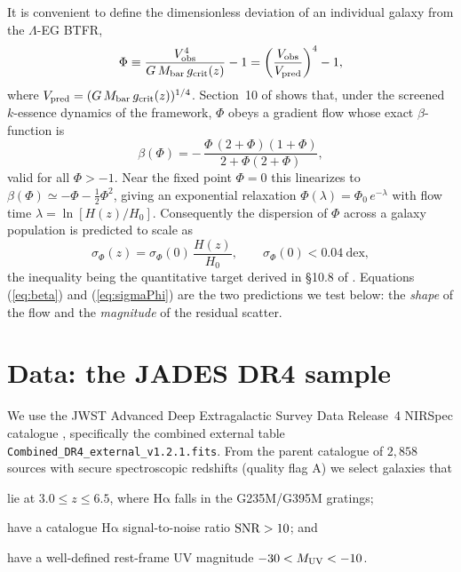 \documentclass{rmxaa}
\newcommand{\gcrit}{g_{\rm crit}}
\newcommand{\Mbar}{M_{\rm bar}}
\newcommand{\Vobs}{V_{\rm obs}}
\newcommand{\Vpred}{V_{\rm pred}}
\newcommand{\Ha}{\ensuremath{\mathrm{H\alpha}}}
\newcommand{\LEG}{\mbox{$\Lambda$-EG}}
\begin{document}
It is convenient to define the dimensionless deviation of an individual
galaxy from the \LEG{} BTFR,
\begin{equation}
  \label{eq:Phi}
  \Phi \equiv \frac{\Vobs^4}{G\,\Mbar\,\gcrit(z)}-1
        = \left(\frac{\Vobs}{\Vpred}\right)^4-1,
\end{equation}
where $\Vpred=(G\,\Mbar\,\gcrit(z))^{1/4}$. Section~10 of
\citet{FigueroaTorres2026} shows that, under the screened $k$-essence
dynamics of the framework, $\Phi$ obeys a gradient flow whose exact
$\beta$-function is
\begin{equation}
  \label{eq:beta}
  \beta(\Phi)= -\,\frac{\Phi\,(2+\Phi)(1+\Phi)}{2+\Phi(2+\Phi)},
\end{equation}
valid for all $\Phi>-1$. Near the fixed point $\Phi=0$ this linearizes
to $\beta(\Phi)\simeq-\Phi-\tfrac12\Phi^2$, giving an exponential
relaxation $\Phi(\lambda)=\Phi_0\,e^{-\lambda}$ with flow time
$\lambda=\ln[H(z)/H_0]$. Consequently the dispersion of $\Phi$ across a
galaxy population is predicted to scale as
\begin{equation}
  \label{eq:sigmaPhi}
  \sigma_\Phi(z)=\sigma_\Phi(0)\,\frac{H(z)}{H_0},\qquad
  \sigma_\Phi(0)<0.04\ \mathrm{dex},
\end{equation}
the inequality being the quantitative target derived in \S10.8 of
\citet{FigueroaTorres2026}. Equations (\ref{eq:beta}) and
(\ref{eq:sigmaPhi}) are the two predictions we test below: the
\emph{shape} of the flow and the \emph{magnitude} of the residual
scatter.

\section{Data: the JADES DR4 sample}
\label{sec:data}

We use the JWST Advanced Deep Extragalactic Survey
\citep[JADES;][]{Bunker2024} Data Release~4 NIRSpec catalogue
\citep{CurtisLake2025,Scholtz2025}, specifically the combined external
table \texttt{Combined\_DR4\_external\_v1.2.1.fits}. From the parent
catalogue of $2{,}858$ sources with secure spectroscopic redshifts
(quality flag A) we select galaxies that

\begin{compactenum}[(i)]
\item lie at $3.0\le z\le 6.5$, where \Ha{} falls in the G235M/G395M
  gratings;
\item have a catalogue \Ha{} signal-to-noise ratio ${\rm SNR}>10$; and
\item have a well-defined rest-frame UV magnitude $-30<M_{\rm UV}<-10$.
\end{compactenum}
\end{document}
